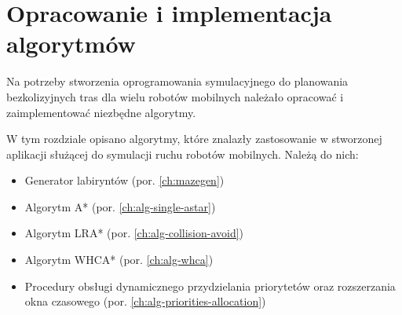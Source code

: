 \chapter{Opracowanie i implementacja algorytmów}
\label{ch:alg-impl}

Na potrzeby stworzenia oprogramowania symulacyjnego do planowania bezkolizyjnych tras dla wielu robotów mobilnych należało opracować i zaimplementować niezbędne algorytmy.

W tym rozdziale opisano algorytmy, które znalazły zastosowanie w stworzonej aplikacji służącej do symulacji ruchu robotów mobilnych. Należą do nich:
\begin{itemize}
	\item Generator labiryntów (por. \ref{ch:mazegen})
	\item Algorytm A* (por. \ref{ch:alg-single-astar})
	\item Algorytm LRA* (por. \ref{ch:alg-collision-avoid})
	\item Algorytm WHCA* (por. \ref{ch:alg-whca})
	\item Procedury obsługi dynamicznego przydzielania priorytetów oraz rozszerzania okna czasowego (por. \ref{ch:alg-priorities-allocation})
\end{itemize}
